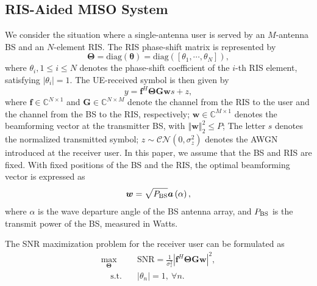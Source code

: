\documentclass[12pt,draftclsnofoot,journal,onecolumn]{IEEEtran}
\theoremstyle{nonumberplain}
\def \diag {\text{diag}}
\begin{document}
    \subsection{RIS-Aided MISO System}  \label{MISO case}
        We consider the situation where a single-antenna user is served by an $M$-antenna BS and an $N$-element \ac{RIS}. The RIS phase-shift matrix is represented by
        \begin{equation}
            \label{RIS}
            \bm \Theta = \diag \left(\bm \theta\right )=\diag \left(\left[\theta_{1},\cdots ,\theta_{N}\right]\right),
        \end{equation}
        where $\theta_i, 1\leq i \leq N$ denotes the phase-shift coefficient of the $i$-th \ac{RIS} element, satisfying $\lvert \theta_i\rvert=1$. The UE-received symbol is then given by 
        \begin{equation}
            \label{Signal model}
            y=\bm f^{H} \bm\Theta \bm G \bm w s+z,
        \end{equation}
        where $\bm f\in \mathbb C ^{N\times 1}$ and $\bm G \in \mathbb C^{N\times M}$ denote the channel from the \ac{RIS} to the user and the channel from the BS to the \ac{RIS}, respectively; $\bm w\in \mathbb C^{M\times 1}$ denotes the beamforming vector at the transmitter BS, with $\left\Vert \bm w\right \Vert_{2}^{2}\leq P$; The letter $s$ denotes the normalized transmitted symbol; $z\sim \mathcal{CN}\left(0,\sigma_{z}^{2}\right)$ denotes the \ac{AWGN} introduced at the receiver user.
        In this paper, we assume that the \ac{BS} and \ac{RIS} are fixed. With fixed positions of the \ac{BS} and the \ac{RIS}, the optimal beamforming vector is expressed as 
        \begin{equation}
            \label{fixed w}
            \bm w=\sqrt{P_{\rm BS}}\bm a\left(\alpha\right),
        \end{equation}
        where $\alpha$ is the wave departure angle of the BS antenna array, and $P_{\rm BS}$ is the transmit power of the BS, measured in Watts. 

The SNR maximization problem for the receiver user can be formulated as
\begin{subequations}
\label{optimization}
\begin{align}
\label{objective}
\max_{\bm \Theta}~~&\text{SNR}=\frac{1}{\sigma_{z}^{2}}
\left\vert
\bm f^{H}\bm \Theta\bm G\bm w \right\vert^{2},\\
\label{constraint}
~~~~~\text{s.t.~~~}&\left\vert\theta_{n}\right\vert=1,~\forall n.
\end{align}
\end{subequations}
\end{document}
